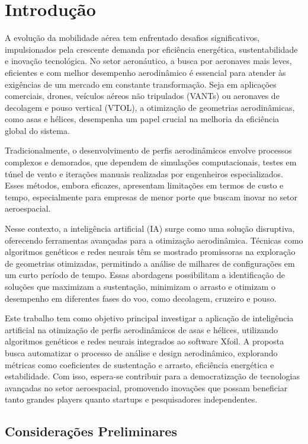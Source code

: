 \chapter{Introdução}

A evolução da mobilidade aérea tem enfrentado desafios significativos, impulsionados pela crescente demanda por eficiência energética, sustentabilidade e inovação tecnológica. No setor aeronáutico, a busca por aeronaves mais leves, eficientes e com melhor desempenho aerodinâmico é essencial para atender às exigências de um mercado em constante transformação. Seja em aplicações comerciais, drones, veículos aéreos não tripulados (VANTs) ou aeronaves de decolagem e pouso vertical (VTOL), a otimização de geometrias aerodinâmicas, como asas e hélices, desempenha um papel crucial na melhoria da eficiência global do sistema.

Tradicionalmente, o desenvolvimento de perfis aerodinâmicos envolve processos complexos e demorados, que dependem de simulações computacionais, testes em túnel de vento e iterações manuais realizadas por engenheiros especializados. Esses métodos, embora eficazes, apresentam limitações em termos de custo e tempo, especialmente para empresas de menor porte que buscam inovar no setor aeroespacial.

Nesse contexto, a inteligência artificial (IA) surge como uma solução disruptiva, oferecendo ferramentas avançadas para a otimização aerodinâmica. Técnicas como algoritmos genéticos e redes neurais têm se mostrado promissoras na exploração de geometrias otimizadas, permitindo a análise de milhares de configurações em um curto período de tempo. Essas abordagens possibilitam a identificação de soluções que maximizam a sustentação, minimizam o arrasto e otimizam o desempenho em diferentes fases do voo, como decolagem, cruzeiro e pouso.

Este trabalho tem como objetivo principal investigar a aplicação de inteligência artificial na otimização de perfis aerodinâmicos de asas e hélices, utilizando algoritmos genéticos e redes neurais integrados ao software Xfoil. A proposta busca automatizar o processo de análise e design aerodinâmico, explorando métricas como coeficientes de sustentação e arrasto, eficiência energética e estabilidade. Com isso, espera-se contribuir para a democratização de tecnologias avançadas no setor aeroespacial, promovendo inovações que possam beneficiar tanto grandes players quanto startups e pesquisadores independentes.

\section{Considerações Preliminares}

